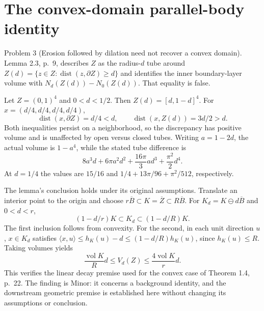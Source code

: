 \documentclass[10pt]{article}
\begin{document}
\section*{The convex-domain parallel-body identity}
Problem 3 (Erosion followed by dilation need not recover a convex domain).  Lemma 2.3, p. 9, describes \(Z\) as the radius-\(d\) tube around \(Z(d)=\{z\in Z:\operatorname{dist}(z,\partial Z)\ge d\}\) and identifies the inner boundary-layer volume with \(N_d(Z(d))-N_0(Z(d))\). That equality is false.\par
Let \(Z=(0,1)^4\) and \(0<d<1/2\). Then \(Z(d)=[d,1-d]^4\). For \(x=(d/4,d/4,d/4,d/4)\), \[\operatorname{dist}(x,\partial Z)=d/4<d,\qquad
 \operatorname{dist}(x,Z(d))=3d/2>d.\] Both inequalities persist on a neighborhood, so the discrepancy has positive volume and is unaffected by open versus closed tubes. Writing \(a=1-2d\), the actual volume is \(1-a^4\), while the stated tube difference is \[8a^3d+6\pi a^2d^2+\frac{16\pi}{3}ad^3+\frac{\pi^2}{2}d^4.\] At \(d=1/4\) the values are \(15/16\) and \(1/4+13\pi/96+\pi^2/512\), respectively.\par
The lemma’s conclusion holds under its original assumptions. Translate an interior point to the origin and choose \(r\overline B\subset K=\overline Z\subset R\overline B\). For \(K_d=K\ominus d\overline B\) and \(0<d<r\), \[(1-d/r)K\subset K_d\subset(1-d/R)K.\] The first inclusion follows from convexity. For the second, in each unit direction \(u\), \(x\in K_d\) satisfies \(\langle x,u\rangle\le h_K(u)-d
\le(1-d/R)h_K(u)\), since \(h_K(u)\le R\). Taking volumes yields \[\frac{\operatorname{vol}K}{R}d\le V_d(Z)\le\frac{4\operatorname{vol}K}{r}d.\] This verifies the linear decay premise used for the convex case of Theorem 1.4, p. 22. The finding is Minor: it concerns a background identity, and the downstream geometric premise is established here without changing its assumptions or conclusion.\par
\end{document}
